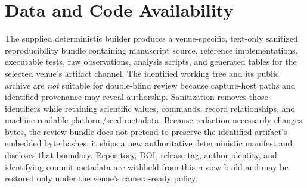 \section{Data and Code Availability}
\label{sec:availability}

The supplied deterministic builder produces a venue-specific, text-only
sanitized reproducibility bundle containing manuscript source, reference
implementations, executable tests, raw observations, analysis scripts, and
generated tables for the selected venue's artifact channel. The identified
working tree and its public archive are \emph{not} suitable for double-blind
review because capture-host paths and identified provenance may reveal
authorship. Sanitization removes those identifiers while retaining scientific
values, commands, record relationships, and machine-readable platform/seed
metadata. Because redaction necessarily changes bytes, the review bundle does
not pretend to preserve the identified artifact's embedded byte hashes: it
ships a new authoritative deterministic manifest and discloses that boundary.
Repository, DOI, release tag, author identity, and identifying commit metadata
are withheld from this review build and may be restored only under the venue's
camera-ready policy.

